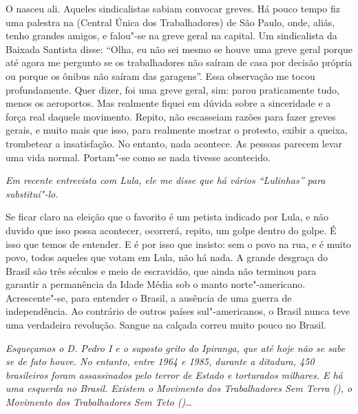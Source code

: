 \normalfont 
O  nasceu ali. Aqueles sindicalistas sabiam convocar
greves. Há pouco tempo fiz uma palestra na  (Central Única dos
Trabalhadores) de São Paulo, onde, aliás, tenho grandes amigos, e
falou"-se na greve geral na capital. Um sindicalista da Baixada Santista
disse: ``Olha, eu não sei mesmo se houve uma greve geral porque até
agora me pergunto se os trabalhadores não saíram de casa por decisão
própria ou porque os ônibus não saíram das garagens''. Essa observação
me tocou profundamente. Quer dizer, foi uma greve geral, sim: parou
praticamente tudo, menos os aeroportos. Mas realmente fiquei em dúvida
sobre a sinceridade e a força real daquele movimento. Repito, não
escasseiam razões para fazer greves gerais, e muito mais que isso, para
realmente mostrar o protesto, exibir a queixa, trombetear a
insatisfação. No entanto, nada acontece. As pessoas parecem levar uma
vida normal. Portam"-se como se nada tivesse acontecido.

\itshape
Em recente entrevista com Lula, ele me disse que há
vários ``Lulinhas'' para substituí"-lo.

\normalfont 
Se ficar claro na eleição que o favorito é um petista
indicado por Lula, e não duvido que isso possa acontecer, ocorrerá,
repito, um golpe dentro do golpe. É isso que temos de entender. E é por
isso que insisto: sem o povo na rua, e é muito povo, todos aqueles que
votam em Lula, não há nada. A grande desgraça do Brasil são três séculos
e meio de escravidão, que ainda não terminou para garantir a permanência
da Idade Média sob o manto norte"-americano. Acrescente"-se, para entender
o Brasil, a ausência de uma guerra de independência. Ao contrário de
outros países sul"-americanos, o Brasil nunca teve uma verdadeira
revolução. Sangue na calçada correu muito pouco no Brasil.

\itshape
Esqueçamos o D. Pedro I e o suposto grito do Ipiranga,
que até hoje não se sabe se de fato houve. No entanto, entre 1964 e
1985, durante a ditadura, 450 brasileiros foram assassinados pelo terror
de Estado e torturados milhares. E há uma esquerda no Brasil. Existem o
Movimento dos Trabalhadores Sem Terra (), o Movimento dos
Trabalhadores Sem Teto ()…

